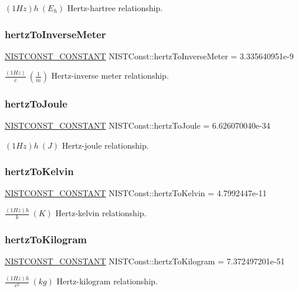 $(1 Hz)h \ (E_h)$ Hertz-\/hartree relationship. \mbox{\label{group___n_i_s_t_const-_hertz_ga26a3ca41f2e8694656bfeb8886b60511}} 
\subsubsection{\texorpdfstring{hertz\+To\+Inverse\+Meter}{hertzToInverseMeter}}
{\footnotesize\ttfamily \mbox{\hyperlink{_n_i_s_t_const_8hpp_a2b0fc1d7452373f816175dd86ce26729}{N\+I\+S\+T\+C\+O\+N\+S\+T\+\_\+\+C\+O\+N\+S\+T\+A\+NT}} N\+I\+S\+T\+Const\+::hertz\+To\+Inverse\+Meter = 3.\+335640951e-\/9}

$\frac{(1 Hz)}{c} \ (\frac{1}{m})$ Hertz-\/inverse meter relationship. \mbox{\label{group___n_i_s_t_const-_hertz_ga9e555f96daf2b8abda55581bdeb8f20d}} 
\subsubsection{\texorpdfstring{hertz\+To\+Joule}{hertzToJoule}}
{\footnotesize\ttfamily \mbox{\hyperlink{_n_i_s_t_const_8hpp_a2b0fc1d7452373f816175dd86ce26729}{N\+I\+S\+T\+C\+O\+N\+S\+T\+\_\+\+C\+O\+N\+S\+T\+A\+NT}} N\+I\+S\+T\+Const\+::hertz\+To\+Joule = 6.\+626070040e-\/34}

$(1 Hz)h \ (J)$ Hertz-\/joule relationship. \mbox{\label{group___n_i_s_t_const-_hertz_ga223541915cf4faaf650c251803e78201}} 
\subsubsection{\texorpdfstring{hertz\+To\+Kelvin}{hertzToKelvin}}
{\footnotesize\ttfamily \mbox{\hyperlink{_n_i_s_t_const_8hpp_a2b0fc1d7452373f816175dd86ce26729}{N\+I\+S\+T\+C\+O\+N\+S\+T\+\_\+\+C\+O\+N\+S\+T\+A\+NT}} N\+I\+S\+T\+Const\+::hertz\+To\+Kelvin = 4.\+7992447e-\/11}

$\frac{(1 Hz)h}{k} \ (K)$ Hertz-\/kelvin relationship. \mbox{\label{group___n_i_s_t_const-_hertz_ga1731a8968f69b7d2efe4ba24e8974172}} 
\subsubsection{\texorpdfstring{hertz\+To\+Kilogram}{hertzToKilogram}}
{\footnotesize\ttfamily \mbox{\hyperlink{_n_i_s_t_const_8hpp_a2b0fc1d7452373f816175dd86ce26729}{N\+I\+S\+T\+C\+O\+N\+S\+T\+\_\+\+C\+O\+N\+S\+T\+A\+NT}} N\+I\+S\+T\+Const\+::hertz\+To\+Kilogram = 7.\+372497201e-\/51}

$\frac{(1 Hz)h}{c^2} \ (kg)$ Hertz-\/kilogram relationship. 